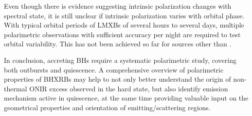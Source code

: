 Even though there is evidence suggesting intrinsic polarization changes with spectral state, it is still unclear if intrinsic polarization varies with orbital phase.
With typical orbital periods of \glspl{LMXB} of several hours to several days, multiple polarimetric observations with sufficient accuracy per night are required to test orbital variability.
This has not been achieved so far for sources other than \iA.

In conclusion, accreting \glspl{BH} require a systematic polarimetric study, covering both outbursts and quiescence.
A comprehensive overview of polarimetric properties of \glspl{BHXRB} may help to not only better understand the origin of non-thermal \gls{ONIR} excess observed in the hard state, but also identify emission mechanism active in quiescence, at the same time providing valuable input on the geometrical properties and orientation of emitting/scattering regions.





